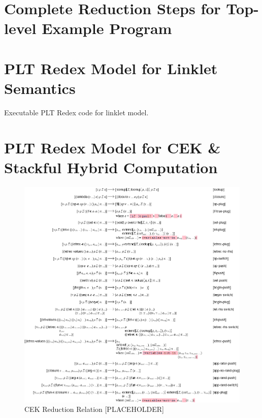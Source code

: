 \begin{appendices}
\chapter[\texorpdfstring{Complete Reduction Steps for Top-level Example Program}{Appendix B}]{Complete Reduction Steps for Top-level Example Program}
\label{appendix:formal-reduction-steps-toplevel-example}


\chapter[\texorpdfstring{PLT Redex Model for Linklet Semantics}{Appendix C}]{PLT Redex Model for Linklet Semantics}
\label{appendix:linklet-semantics-model-redex-code}

    \begin{figure-here}
        Executable PLT Redex code for linklet model.
    \end{figure-here}

\chapter[\texorpdfstring{PLT Redex Model for CEK \& Stackful Hybrid Computation}
                          {Appendix D}]{PLT Redex Model for CEK \& Stackful Hybrid Computation}
\label{appendix:cek-stackful-redex}

    \begin{figure}[!h]
        \centering
        \includegraphics[scale=0.4]{sections/figures/cek-reduction-relation.png}
        \caption{CEK Reduction Relation [PLACEHOLDER]}
        \label{fig:cek-reduction-relation-redacted}
    \end{figure}


\end{appendices}
